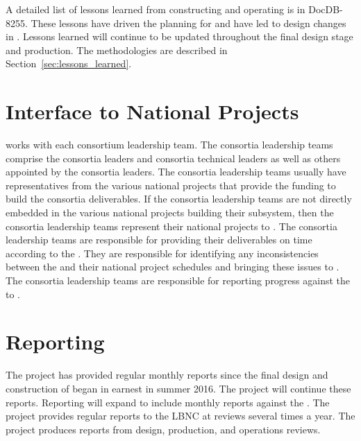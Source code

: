A detailed list of lessons learned from constructing and operating
 is in DocDB-8255. These lessons have
driven the planning for  and have led to design changes in
. Lessons learned will continue to be updated throughout the final
design stage and production. The methodologies are described in
Section~\ref{sec:lessons_learned}.

\section{Interface to National Projects}
\label{sec:fdsp-coord-national}

  works with each consortium leadership team. The
consortia leadership teams comprise the consortia leaders and 
consortia technical leaders as well as others appointed by the consortia
leaders. The consortia leadership teams usually have representatives
from the various national projects that provide the funding to build the consortia
deliverables. If the consortia leadership teams are not directly
embedded in the various national projects building their subsystem,
then the consortia leadership teams represent their national projects
to . The consortia leadership teams are responsible for
providing their deliverables on time according to the
. They are responsible for identifying any inconsistencies
between the  and their national project schedules and
bringing these issues to . The consortia leadership teams
are responsible for reporting progress against the  to
.

\section{Reporting}
\label{sec:fdsp-coord-reporting}

The  project has provided regular monthly reports
since the final design and construction of  began in
earnest in summer 2016. The project will continue these reports. Reporting will expand to include monthly reports
against the . The  project provides regular
reports to the LBNC at reviews several times a year. The  project
produces reports from design, production, and operations reviews.



